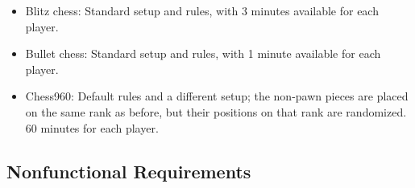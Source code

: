 \documentclass{article}
\begin{document}
\begin{itemize}
\begin{itemize}
\begin{itemize}
			\item Blitz chess: Standard setup and rules, with 3 minutes available for each player.
			\item Bullet chess: Standard setup and rules, with 1 minute available for each player.
			\item Chess960: Default rules and a different setup; the non-pawn pieces are placed on the same rank as before, but their positions on that rank are randomized. 60 minutes for each player.
		\end{itemize}
	\end{itemize}
\end{itemize}

\subsection{Nonfunctional Requirements}
\end{document}

